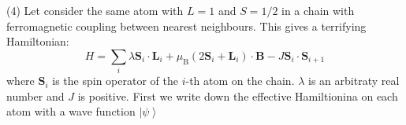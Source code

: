 \documentclass[letter]{article}
\begin{document}
\indent (4) Let consider the same atom with $L=1$ and $S=1/2$ in a chain with ferromagnetic coupling between nearest neighbours. This gives a terrifying Hamiltonian: 
$$
H=\sum _ {i} \lambda \bm{S}_i \cdot \bm{L}_i+ \mu_{\mathrm{B}} (2\bm{S}_i+\bm{L}_i)\cdot \bm{B}-J \bm{S}_i\cdot \bm{S}_{i+1}
$$
where $\bm{S}_i$ is the spin operator of the $i$-th atom on the chain. $\lambda$ is an arbitraty real number and $J$ is positive.
First we write down the effective Hamiltionina on each atom with a wave function $\left|\psi\right>$
\end{document}
